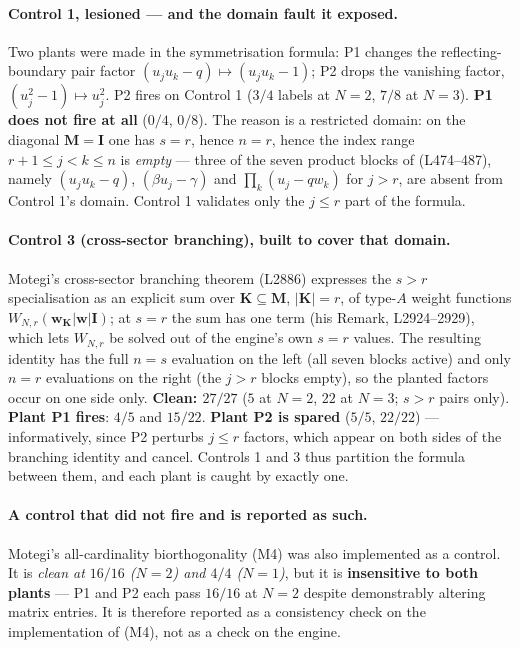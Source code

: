 \documentclass[11pt]{article}
\theoremstyle{plain}
\theoremstyle{definition}
\theoremstyle{remark}
\newcommand{\bI}{\mathbf{I}}
\newcommand{\bM}{\mathbf{M}}
\newcommand{\bK}{\mathbf{K}}
\newcommand{\bw}{\mathbf{w}}
\begin{document}
\paragraph{Control 1, lesioned --- and the domain fault it exposed.}
Two plants were made in the symmetrisation formula:
P1 changes the reflecting-boundary pair factor $(u_ju_k-q)\mapsto(u_ju_k-1)$;
P2 drops the vanishing factor, $(u_j^2-1)\mapsto u_j^2$.
P2 fires on Control 1 ($3/4$ labels at $N=2$, $7/8$ at $N=3$).
\textbf{P1 does not fire at all} ($0/4$, $0/8$).  The reason is a restricted
domain: on the diagonal $\bM=\bI$ one has $s=r$, hence $n=r$, hence the index
range $r+1\le j<k\le n$ is \emph{empty} --- three of the seven product blocks of
(L474--487), namely $(u_ju_k-q)$, $(\beta u_j-\gamma)$ and
$\prod_k(u_j-qw_k)$ for $j>r$, are absent from Control 1's domain.  Control 1
validates only the $j\le r$ part of the formula.

\paragraph{Control 3 (cross-sector branching), built to cover that domain.}
Motegi's cross-sector branching theorem (L2886) expresses the $s>r$
specialisation as an explicit sum over $\bK\subseteq\bM$, $|\bK|=r$, of type-$A$
weight functions $W_{N,r}(\bw_{\bK}|\bw|\bI)$; at $s=r$ the sum has one term
(his Remark, L2924--2929), which lets $W_{N,r}$ be solved out of the engine's
own $s=r$ values.  The resulting identity has the full $n=s$ evaluation on the
left (all seven blocks active) and only $n=r$ evaluations on the right (the
$j>r$ blocks empty), so the planted factors occur on one side only.
\textbf{Clean: $27/27$} ($5$ at $N=2$, $22$ at $N=3$; $s>r$ pairs only).
\textbf{Plant P1 fires}: $4/5$ and $15/22$.  \textbf{Plant P2 is spared}
($5/5$, $22/22$) --- informatively, since P2 perturbs $j\le r$ factors, which
appear on both sides of the branching identity and cancel.  Controls 1 and 3
thus partition the formula between them, and each plant is caught by exactly one.

\paragraph{A control that did not fire and is reported as such.}
Motegi's all-cardinality biorthogonality (M4) was also implemented as a control.
It is \emph{clean at $16/16$ ($N=2$) and $4/4$ ($N=1$)}, but it is
\textbf{insensitive to both plants} --- P1 and P2 each pass $16/16$ at $N=2$
despite demonstrably altering matrix entries.  It is therefore reported as a
consistency check on the implementation of (M4), not as a check on the engine.
\end{document}
